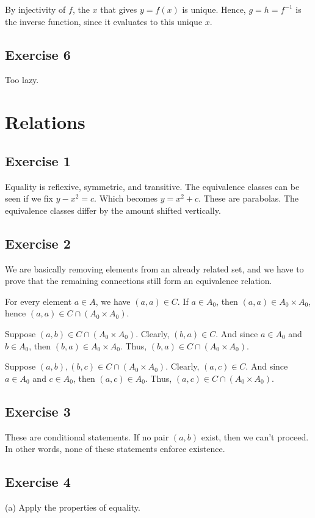 \documentclass{book}
\begin{document}
By injectivity of $f$, the $x$ that gives $y = f(x)$ is unique. Hence, $g = h = f^{-1}$ is the inverse function, since it evaluates to this unique $x$.

\subsection*{Exercise 6}
Too lazy.

\section{Relations}

\subsection*{Exercise 1}
Equality is reflexive, symmetric, and transitive. The equivalence classes can be seen if we fix $y - x^2 = c$. Which becomes $y = x^2 + c$. These are parabolas. The equivalence classes differ by the amount shifted vertically.

\subsection*{Exercise 2}
We are basically removing elements from an already related set, and we have to prove that the remaining connections still form an equivalence relation.

For every element $a \in A$, we have $(a, a) \in C$. If $a \in A_0$, then $(a, a) \in A_0 \times A_0$, hence $(a, a) \in C \cap (A_0 \times A_0)$.

Suppose $(a, b) \in C \cap (A_0 \times A_0)$. Clearly, $(b, a) \in C$. And since $a \in A_0$ and $b \in A_0$, then $(b, a) \in A_0 \times A_0$. Thus, $(b, a) \in C \cap (A_0 \times A_0)$.

Suppose $(a, b), (b, c) \in C \cap (A_0 \times A_0)$. Clearly, $(a, c) \in C$. And since $a \in A_0$ and $c \in A_0$, then $(a, c) \in A_0$. Thus, $(a, c) \in C \cap (A_0 \times A_0)$.

\subsection*{Exercise 3}
These are conditional statements. If no pair $(a, b)$ exist, then we can't proceed. In other words, none of these statements enforce existence.

\subsection*{Exercise 4}
(a)
Apply the properties of equality.
\end{document}
